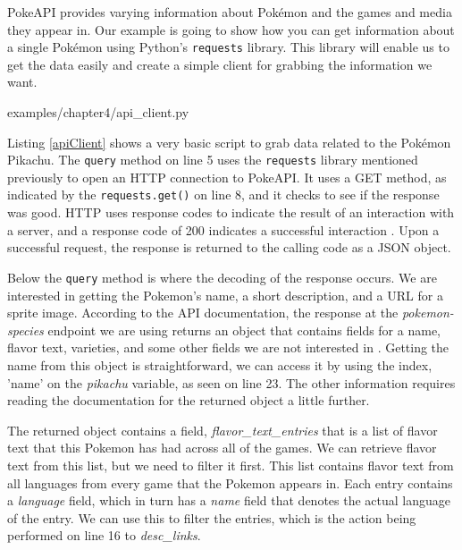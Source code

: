 \documentclass[12pt, oneside, a4paper]{book}
\begin{document}
      PokeAPI provides varying information about Pokémon and the games and media they appear in.
      Our example is going to show how you can get information about a single Pokémon using Python's \lstinline!requests! library.
      This library will enable us to get the data easily and create a simple client for grabbing the information we want.

      
      {examples/chapter4/api_client.py}

      Listing \ref{apiClient} shows a very basic script to grab data related to the Pokémon Pikachu.
      The \lstinline!query! method on line 5 uses the \lstinline!requests! library mentioned previously to open an HTTP connection to PokeAPI.
      It uses a GET method, as indicated by the \lstinline!requests.get()! on line 8, and it checks to see if the response was good.
      HTTP uses response codes to indicate the result of an interaction with a server, and a response code of 200 indicates a successful interaction \autocite{mozillaHTTPResponseStatus}.
      Upon a successful request, the response is returned to the calling code as a JSON object.
      
      Below the \lstinline!query! method is where the decoding of the response occurs.
      We are interested in getting the Pokemon's name, a short description, and a URL for a sprite image.
      According to the API documentation, the response at the \textit{pokemon-species} endpoint we are using returns an object that contains fields for a name, flavor text, varieties, and some other fields we are not interested in \autocite{hallettPokeAPI}.
      Getting the name from this object is straightforward, we can access it by using the index, 'name' on the \textit{pikachu} variable, as seen on line 23.
      The other information requires reading the documentation for the returned object a little further.

      The returned object contains a field, \textit{flavor\_text\_entries} that is a list of flavor text that this Pokemon has had across all of the games.
      We can retrieve flavor text from this list, but we need to filter it first.
      This list contains flavor text from all languages from every game that the Pokemon appears in.
      Each entry contains a \textit{language} field, which in turn has a \textit{name} field that denotes the actual language of the entry.
      We can use this to filter the entries, which is the action being performed on line 16 to \textit{desc\_links}.
\end{document}
